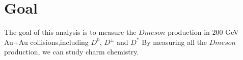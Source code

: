 \clearpage
\section{Goal}
The goal of this analysis is to measure the $Dmeson$ production in 200 GeV Au+Au collisions,including $D^0$, $D^{\pm}$ and $D^{*}$
By measuring all the $Dmeson$ production, we can study charm chemistry.

